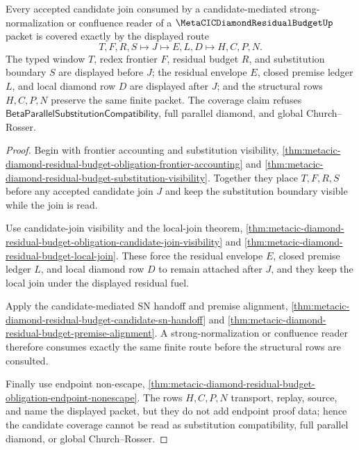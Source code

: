 \begin{theorem}
\label{thm:metacic-diamond-residual-budget-premise-candidate-coverage}
Every accepted candidate join consumed by a candidate-mediated strong-normalization or confluence reader of a $\MetaCICDiamondResidualBudgetUp$ packet is covered exactly by the displayed route
$$
T,F,R,S \longmapsto J \longmapsto E,L,D \longmapsto H,C,P,N .
$$
The typed window $T$, redex frontier $F$, residual budget $R$, and substitution boundary $S$ are displayed before $J$; the residual envelope $E$, closed premise ledger $L$, and local diamond row $D$ are displayed after $J$; and the structural rows $H,C,P,N$ preserve the same finite packet. The coverage claim refuses $\mathsf{BetaParallelSubstitutionCompatibility}$, full parallel diamond, and global Church--Rosser.
\end{theorem}
\begin{proof}
Begin with frontier accounting and substitution visibility, \autoref{thm:metacic-diamond-residual-budget-obligation-frontier-accounting} and \autoref{thm:metacic-diamond-residual-budget-substitution-visibility}. Together they place $T,F,R,S$ before any accepted candidate join $J$ and keep the substitution boundary visible while the join is read.

Use candidate-join visibility and the local-join theorem, \autoref{thm:metacic-diamond-residual-budget-obligation-candidate-join-visibility} and \autoref{thm:metacic-diamond-residual-budget-local-join}. These force the residual envelope $E$, closed premise ledger $L$, and local diamond row $D$ to remain attached after $J$, and they keep the local join under the displayed residual fuel.

Apply the candidate-mediated SN handoff and premise alignment, \autoref{thm:metacic-diamond-residual-budget-candidate-sn-handoff} and \autoref{thm:metacic-diamond-residual-budget-premise-alignment}. A strong-normalization or confluence reader therefore consumes exactly the same finite route before the structural rows are consulted.

Finally use endpoint non-escape, \autoref{thm:metacic-diamond-residual-budget-obligation-endpoint-nonescape}. The rows $H,C,P,N$ transport, replay, source, and name the displayed packet, but they do not add endpoint proof data; hence the candidate coverage cannot be read as substitution compatibility, full parallel diamond, or global Church--Rosser.
\end{proof}

